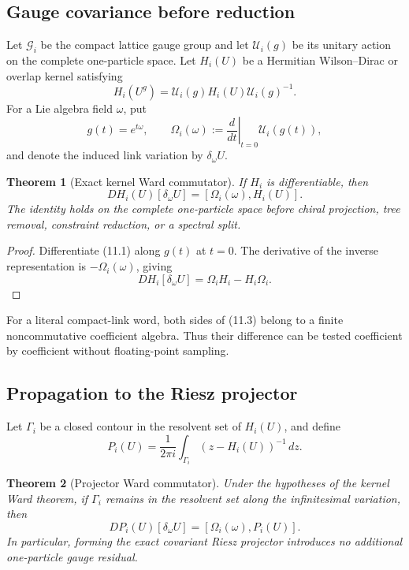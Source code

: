 \documentclass[11pt]{article}
\newtheorem{theorem}{Theorem}[section]
\begin{document}
\subsection{Gauge covariance before reduction}

Let \(\mathcal G_i\) be the compact lattice gauge group and let
\(\mathcal U_i(g)\) be its unitary action on the complete one-particle
space.  Let \(H_i(U)\) be a Hermitian Wilson--Dirac or overlap kernel
satisfying
\[
 H_i(U^g)=\mathcal U_i(g)H_i(U)\mathcal U_i(g)^{-1}.
 \tag{11.1}
\]
For a Lie algebra field \(\omega\), put
\[
 g(t)=e^{t\omega},\qquad
 \Omega_i(\omega):=
 \left.\frac{d}{dt}\right|_{t=0}\mathcal U_i(g(t)),
 \tag{11.2}
\]
and denote the induced link variation by \(\delta_\omega U\).

\begin{theorem}[Exact kernel Ward commutator]
\label{thm:v11v11-kernel-ward}
If \(H_i\) is differentiable, then
\[
 D H_i(U)[\delta_\omega U]
 =
 [\Omega_i(\omega),H_i(U)].
 \tag{11.3}
\]
The identity holds on the complete one-particle space before chiral
projection, tree removal, constraint reduction, or a spectral split.
\end{theorem}

\begin{proof}
Differentiate (11.1) along \(g(t)\) at \(t=0\).  The derivative of the
inverse representation is \(-\Omega_i(\omega)\), giving
\[
 DH_i[\delta_\omega U]
 =
 \Omega_iH_i-H_i\Omega_i.
\]
\end{proof}

For a literal compact-link word, both sides of (11.3) belong to a finite
noncommutative coefficient algebra.  Thus their difference can be tested
coefficient by coefficient without floating-point sampling.

\subsection{Propagation to the Riesz projector}

Let \(\Gamma_i\) be a closed contour in the resolvent set of \(H_i(U)\),
and define
\[
 P_i(U)=\frac1{2\pi i}\int_{\Gamma_i}(z-H_i(U))^{-1}\,dz.
 \tag{11.4}
\]

\begin{theorem}[Projector Ward commutator]
\label{thm:v11v11-projector-ward}
Under the hypotheses of the kernel Ward theorem, if \(\Gamma_i\) remains
in the resolvent set along the infinitesimal variation, then
\[
 DP_i(U)[\delta_\omega U]
 =
 [\Omega_i(\omega),P_i(U)].
 \tag{11.5}
\]
In particular, forming the exact covariant Riesz projector introduces no
additional one-particle gauge residual.
\end{theorem}
\end{document}
